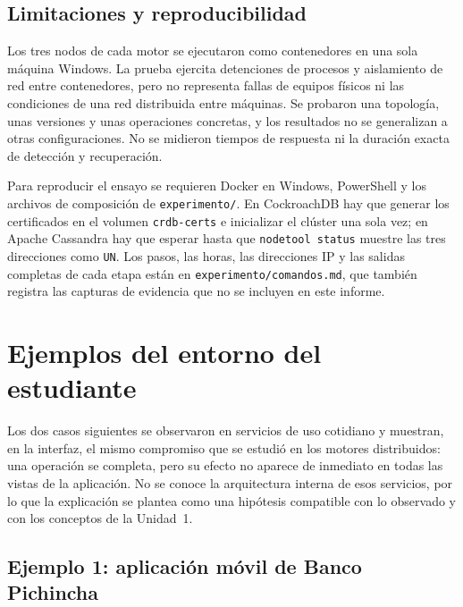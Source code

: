 \documentclass[11pt,a4paper]{article}
\newcommand{\sistemaA}{CockroachDB}      %
\newcommand{\sistemaB}{Apache Cassandra} %
\begin{document}
\subsection{Limitaciones y reproducibilidad}

Los tres nodos de cada motor se ejecutaron como contenedores en una sola máquina
Windows. La prueba ejercita detenciones de procesos y aislamiento de red entre
contenedores, pero no representa fallas de equipos físicos ni las condiciones de una
red distribuida entre máquinas. Se probaron una topología, unas versiones y unas
operaciones concretas, y los resultados no se generalizan a otras configuraciones.
No se midieron tiempos de respuesta ni la duración exacta de detección y
recuperación.

Para reproducir el ensayo se requieren Docker en Windows, PowerShell y los archivos
de composición de \texttt{experimento/}. En \sistemaA{} hay que generar los
certificados en el volumen \texttt{crdb-certs} e inicializar el clúster una sola vez;
en \sistemaB{} hay que esperar hasta que \texttt{nodetool status} muestre las tres
direcciones como \texttt{UN}. Los pasos, las horas, las direcciones IP y las salidas
completas de cada etapa están en \texttt{experimento/comandos.md}, que también
registra las capturas de evidencia que no se incluyen en este informe.


\section{Ejemplos del entorno del estudiante}

Los dos casos siguientes se observaron en servicios de uso cotidiano y muestran, en la
interfaz, el mismo compromiso que se estudió en los motores distribuidos: una
operación se completa, pero su efecto no aparece de inmediato en todas las vistas de
la aplicación. No se conoce la arquitectura interna de esos servicios, por lo que la
explicación se plantea como una hipótesis compatible con lo observado y con los
conceptos de la Unidad~1.

\subsection{Ejemplo 1: aplicación móvil de Banco Pichincha}
\end{document}
